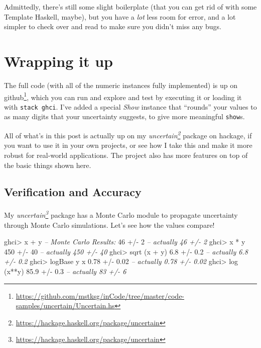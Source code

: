 \documentclass[]{article}
\newenvironment{Shaded}{}{}
\newcommand{\DecValTok}[1]{\textcolor[rgb]{0.25,0.63,0.44}{{#1}}}
\newcommand{\FloatTok}[1]{\textcolor[rgb]{0.25,0.63,0.44}{{#1}}}
\newcommand{\CommentTok}[1]{\textcolor[rgb]{0.38,0.63,0.69}{\textit{{#1}}}}
\newcommand{\FunctionTok}[1]{\textcolor[rgb]{0.02,0.16,0.49}{{#1}}}
\newcommand{\NormalTok}[1]{{#1}}
\renewcommand{\href}[2]{#2\footnote{\url{#1}}}
\begin{document}
Admittedly, there's still some slight boilerplate (that you can get rid
of with some Template Haskell, maybe), but you have a \emph{lot} less
room for error, and a lot simpler to check over and read to make sure
you didn't miss any bugs.

\section{Wrapping it up}\label{wrapping-it-up}

The full code (with all of the numeric instances fully implemented) is
up
\href{https://github.com/mstksg/inCode/tree/master/code-samples/uncertain/Uncertain.hs}{on
github}, which you can run and explore and test by executing it or
loading it with \texttt{stack\ ghci}. I've added a special \emph{Show}
instance that ``rounds'' your values to as many digits that your
uncertainty suggests, to give more meaningful \texttt{show}s.

All of what's in this post is actually up on my
\emph{\href{https://hackage.haskell.org/package/uncertain}{uncertain}}
package on hackage, if you want to use it in your own projects, or see
how I take this and make it more robust for real-world applications. The
project also has more features on top of the basic things shown here.

\subsection{Verification and Accuracy}\label{verification-and-accuracy}

My
\emph{\href{https://hackage.haskell.org/package/uncertain}{uncertain}}
package has a Monte Carlo module to propagate uncertainty through Monte
Carlo simulations. Let's see how the values compare!

\begin{Shaded}
\begin{Highlighting}[]
\NormalTok{ghci}\FunctionTok{>} \NormalTok{x }\FunctionTok{+} \NormalTok{y         }\CommentTok{-- Monte Carlo Results:}
\DecValTok{46} \FunctionTok{+/-} \DecValTok{2}            \CommentTok{-- actually 46 +/- 2}
\NormalTok{ghci}\FunctionTok{>} \NormalTok{x }\FunctionTok{*} \NormalTok{y}
\DecValTok{450} \FunctionTok{+/-} \DecValTok{40}          \CommentTok{-- actually 450 +/- 40}
\NormalTok{ghci}\FunctionTok{>} \NormalTok{sqrt (x }\FunctionTok{+} \NormalTok{y)}
\FloatTok{6.8} \FunctionTok{+/-} \FloatTok{0.2}         \CommentTok{-- actually 6.8 +/- 0.2}
\NormalTok{ghci}\FunctionTok{>} \NormalTok{logBase y x}
\FloatTok{0.78} \FunctionTok{+/-} \FloatTok{0.02}       \CommentTok{-- actually 0.78 +/- 0.02}
\NormalTok{ghci}\FunctionTok{>} \NormalTok{log (x}\FunctionTok{**}\NormalTok{y)}
\FloatTok{85.9} \FunctionTok{+/-} \FloatTok{0.3}        \CommentTok{-- actually 83 +/- 6}
\end{Highlighting}
\end{Shaded}
\end{document}
